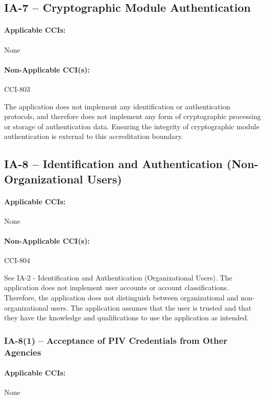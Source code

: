 \documentclass[letterpaper, 10pt, twoside]{article}
\begin{document}
\subsection{IA-7 -- Cryptographic Module Authentication}

\paragraph{Applicable CCIs:} None

\paragraph{Non-Applicable CCI(s):} CCI-803

The application does not implement any identification or authentication protocols, and therefore does not implement any form of cryptographic processing or storage of authentication data. Ensuring the integrity of cryptographic module authentication is external to this accreditation boundary.

\subsection{IA-8 -- Identification and Authentication (Non-Organizational Users)}

\paragraph{Applicable CCIs:} None

\paragraph{Non-Applicable CCI(s):} CCI-804

See IA-2 - Identification and Authentication (Organizational Users). The application does not implement user accounts or account classifications. Therefore, the application does not distinguish between organizational and non-organizational users. The application assumes that the user is trusted and that they have the knowledge and qualifications to use the application as intended.

\subsubsection{IA-8(1) -- Acceptance of PIV Credentials from Other Agencies}

\paragraph{Applicable CCIs:} None
\end{document}
